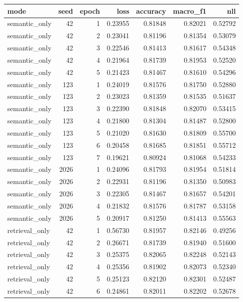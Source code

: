 \begin{tabular}{lrrrrrr}
\toprule
mode & seed & epoch & loss & accuracy & macro_f1 & nll \\
\midrule
semantic_only & 42 & 1 & 0.23955 & 0.81848 & 0.82021 & 0.52792 \\
semantic_only & 42 & 2 & 0.23041 & 0.81196 & 0.81354 & 0.53079 \\
semantic_only & 42 & 3 & 0.22546 & 0.81413 & 0.81617 & 0.54348 \\
semantic_only & 42 & 4 & 0.21964 & 0.81739 & 0.81953 & 0.52520 \\
semantic_only & 42 & 5 & 0.21423 & 0.81467 & 0.81610 & 0.54296 \\
semantic_only & 123 & 1 & 0.24019 & 0.81576 & 0.81750 & 0.52880 \\
semantic_only & 123 & 2 & 0.23023 & 0.81359 & 0.81535 & 0.51637 \\
semantic_only & 123 & 3 & 0.22390 & 0.81848 & 0.82070 & 0.53415 \\
semantic_only & 123 & 4 & 0.21800 & 0.81304 & 0.81487 & 0.52800 \\
semantic_only & 123 & 5 & 0.21020 & 0.81630 & 0.81809 & 0.55700 \\
semantic_only & 123 & 6 & 0.20458 & 0.81685 & 0.81851 & 0.55712 \\
semantic_only & 123 & 7 & 0.19621 & 0.80924 & 0.81068 & 0.54233 \\
semantic_only & 2026 & 1 & 0.24096 & 0.81793 & 0.81954 & 0.51814 \\
semantic_only & 2026 & 2 & 0.22931 & 0.81196 & 0.81350 & 0.50983 \\
semantic_only & 2026 & 3 & 0.22305 & 0.81467 & 0.81657 & 0.54201 \\
semantic_only & 2026 & 4 & 0.21832 & 0.81576 & 0.81787 & 0.53158 \\
semantic_only & 2026 & 5 & 0.20917 & 0.81250 & 0.81413 & 0.55563 \\
retrieval_only & 42 & 1 & 0.56730 & 0.81957 & 0.82146 & 0.49256 \\
retrieval_only & 42 & 2 & 0.26671 & 0.81739 & 0.81940 & 0.51600 \\
retrieval_only & 42 & 3 & 0.25375 & 0.82065 & 0.82248 & 0.52143 \\
retrieval_only & 42 & 4 & 0.25356 & 0.81902 & 0.82073 & 0.52340 \\
retrieval_only & 42 & 5 & 0.25123 & 0.82120 & 0.82301 & 0.52487 \\
retrieval_only & 42 & 6 & 0.24861 & 0.82011 & 0.82202 & 0.52678 \\

\end{tabular}

